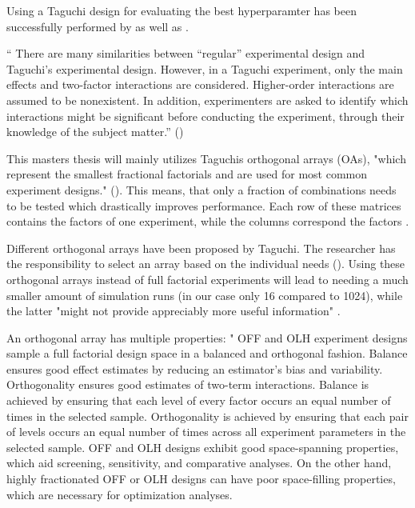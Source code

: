 
Using a Taguchi design for evaluating the best hyperparamter has been successfully performed by \cite{dao_maximising_2016} as well as \cite{naruka_parameter_2019}. 

\enquote{ There are many similarities between “regular” experimental design and Taguchi's experimental design. However, in a Taguchi experiment, only the main effects and two-factor interactions are considered. Higher-order interactions are assumed to be nonexistent. In addition, experimenters are asked to identify which interactions might be significant before conducting the experiment, through their knowledge of the subject matter.} (\cite{yang_design_2009})

This masters thesis will mainly utilizes Taguchis orthogonal arrays (OAs), "which represent the smallest fractional factorials and are used for most common experiment designs." (\cite{roy_primer_1990}). This means, that only a fraction of combinations needs to be tested which drastically improves performance. Each row of these matrices contains the factors of one experiment, while the columns correspond the factors \cite{li_taguchi_2021}. 

Different orthogonal arrays have been proposed by Taguchi. The researcher has the responsibility to select an array based on the individual needs (\cite{li_taguchi_2021}).
Using these orthogonal arrays instead of full factorial experiments will lead to needing a much smaller amount of simulation runs (in our case only 16 compared to 1024), while the latter "might not provide appreciably more useful information" \cite{roy_primer_1990}.


An orthogonal array has multiple properties:
"
OFF and OLH experiment designs sample a full factorial design space in a balanced and orthogonal fashion. Balance ensures good effect estimates by reducing an estimator’s bias and variability. Orthogonality ensures good estimates of two-term interactions. Balance is achieved by ensuring that each level of every factor occurs an equal number of times in the selected sample. Orthogonality is achieved by ensuring that each pair of levels occurs an equal number of times across all experiment parameters in the selected sample. OFF and OLH designs exhibit good space-spanning properties, which aid screening, sensitivity, and comparative analyses. On the other hand, highly fractionated OFF or OLH designs can have poor space-filling properties, which are necessary for optimization analyses.


